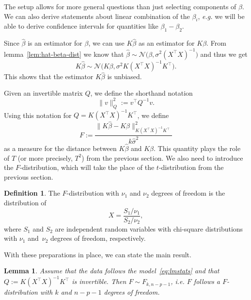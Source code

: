 \documentclass[
  a4paper,
]{article}
\newtheorem{lemma}{Lemma}[section]
\theoremstyle{definition}
\newtheorem{definition}{Definition}[section]
\theoremstyle{definition}
\theoremstyle{definition}
\theoremstyle{definition}
\theoremstyle{remark}
\begin{document}
The setup allows for more general questions than just selecting components
of \(\beta\). We can also derive statements about linear combination of
the \(\beta_i\), \emph{e.g.} we will be able to derive confidence intervals
for quantities like \(\beta_1 - \beta_2\).

Since \(\hat\beta\) is an estimator for \(\beta\), we can use \(K\hat\beta\) as an
estimator for \(K\beta\). From lemma~\ref{lem:hat-beta-dist} we know that
\(\hat\beta \sim \mathcal{N}\bigl( \beta, \sigma^2 (X^\top X)^{-1} \bigr)\) and thus
we get
\begin{equation*}
  K\hat\beta
  \sim \mathcal{N}\bigl( K \beta, \sigma^2 K (X^\top X)^{-1} K^\top \bigr).
\end{equation*}
This shows that the estimator \(K\hat\beta\) is unbiased.

Given an invertible matrix \(Q\), we define the shorthand notation
\begin{equation*}
  \| v \|_Q^2
  := v^\top Q^{-1} v.
\end{equation*}
Using this notation for \(Q = K(X^\top X)^{-1} K^\top\), we define
\begin{equation}
  F
  := \frac{\bigl\| K \hat\beta - K \beta \bigr\|_{K(X^\top X)^{-1} K^\top}^2}
          {k \hat\sigma^2} \label{eq:simult-F}
\end{equation}
as a measure for the distance between \(K\hat\beta\) and \(K\beta\). This
quantity plays the role of \(T\) (or more precisely, \(T^2\)) from the previous
section. We also need to introduce the \(F\)-distribution, which will take the
place of the \(t\)-distribution from the previous section.

\begin{definition}
The \(F\)-distribution with \(\nu_1\) and \(\nu_2\) degrees of freedom is the
distribution of
\begin{equation*}
  X
  =\frac{S_1/\nu_1}{S_2/\nu_2},
\end{equation*}
where \(S_1\) and \(S_2\) are independent random variables with chi-square
distributions with \(\nu_1\) and~\(\nu_2\) degrees of freedom, respectively.
\end{definition}

With these preparations in place, we can state the main result.

\begin{lemma}
\protect\hypertarget{lem:F-dist}{}\label{lem:F-dist}Assume that the data follows the model~\eqref{eq:lmstats}
and that \(Q := K(X^\top X)^{-1} K^\top\) is invertible.
Then \(F \sim F_{k,n-p-1}\), \emph{i.e.} \(F\) follows a
\(F\)-distribution with \(k\) and \(n-p-1\) degrees of freedom.
\end{lemma}
\end{document}
